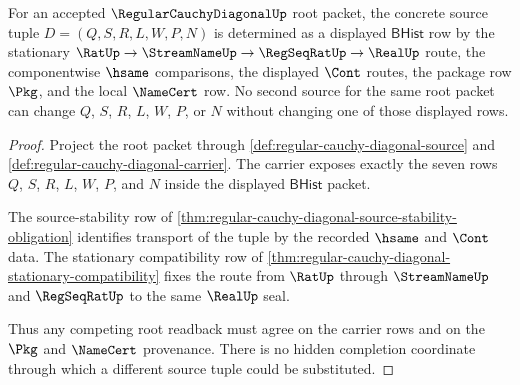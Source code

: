 \begin{theorem}
\label{thm:regular-cauchy-diagonal-root-source-determinacy}
For an accepted $\RegularCauchyDiagonalUp$ root packet, the concrete source tuple $D=(Q,S,R,L,W,P,N)$ is determined as a displayed $\mathsf{BHist}$ row by the stationary $\RatUp \to \StreamNameUp \to \RegSeqRatUp \to \RealUp$ route, the componentwise $\hsame$ comparisons, the displayed $\Cont$ routes, the package row $\Pkg$, and the local $\NameCert$ row. No second source for the same root packet can change $Q$, $S$, $R$, $L$, $W$, $P$, or $N$ without changing one of those displayed rows.
\end{theorem}
\begin{proof}
Project the root packet through \autoref{def:regular-cauchy-diagonal-source} and \autoref{def:regular-cauchy-diagonal-carrier}. The carrier exposes exactly the seven rows $Q$, $S$, $R$, $L$, $W$, $P$, and $N$ inside the displayed $\mathsf{BHist}$ packet.

The source-stability row of \autoref{thm:regular-cauchy-diagonal-source-stability-obligation} identifies transport of the tuple by the recorded $\hsame$ and $\Cont$ data. The stationary compatibility row of \autoref{thm:regular-cauchy-diagonal-stationary-compatibility} fixes the route from $\RatUp$ through $\StreamNameUp$ and $\RegSeqRatUp$ to the same $\RealUp$ seal.

Thus any competing root readback must agree on the carrier rows and on the $\Pkg$ and $\NameCert$ provenance. There is no hidden completion coordinate through which a different source tuple could be substituted.
\end{proof}

